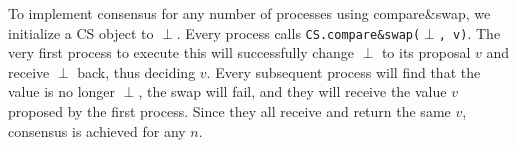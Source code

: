 To implement consensus for any number of processes using compare\&swap, we initialize a CS object to $\perp$. Every process calls \texttt{CS.compare\&swap($\perp$, v)}. The very first process to execute this will successfully change $\perp$ to its proposal $v$ and receive $\perp$ back, thus deciding $v$. Every subsequent process will find that the value is no longer $\perp$, the swap will fail, and they will receive the value $v$ proposed by the first process. Since they all receive and return the same $v$, consensus is achieved for any $n$.